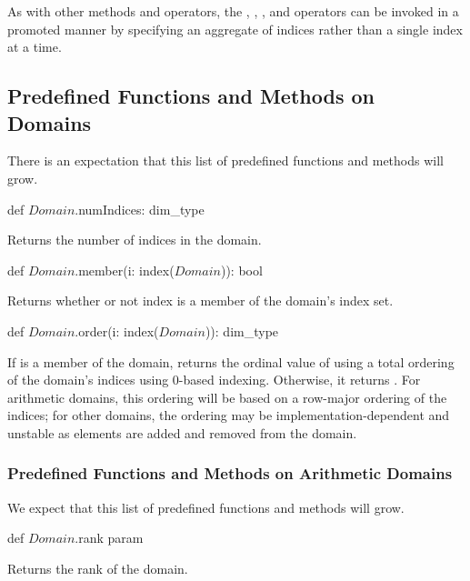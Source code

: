 As with other methods and operators, the , ,
\chpl{+=}, and \chpl{-=} operators can be invoked in a promoted manner
by specifying an aggregate of indices rather than a single index at a
time.

\subsection{Predefined Functions and Methods on Domains}

There is an expectation that this list of predefined functions and
methods will grow.

\begin{protohead}
def $Domain$.numIndices: dim_type
\end{protohead}
\begin{protobody}
Returns the number of indices in the domain.
\end{protobody}

\begin{protohead}
def $Domain$.member(i: index($Domain$)): bool
\end{protohead}
\begin{protobody}
Returns whether or not index  is a member of the domain's
index set.
\end{protobody}

\begin{protohead}
def $Domain$.order(i: index($Domain$)): dim_type
\end{protohead}
\begin{protobody}
If  is a member of the domain, returns the ordinal value of
 using a total ordering of the domain's indices using 0-based
indexing.  Otherwise, it returns .  For arithmetic
domains, this ordering will be based on a row-major ordering of the
indices; for other domains, the ordering may be
implementation-dependent and unstable as elements are added and
removed from the domain.
\end{protobody}


\subsubsection{Predefined Functions and Methods on Arithmetic Domains}

We expect that this list of predefined functions and methods will
grow.

\begin{protohead}
def $Domain$.rank param
\end{protohead}
\begin{protobody}
Returns the rank of the domain.
\end{protobody}

